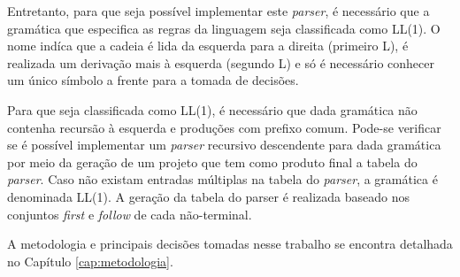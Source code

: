 Entretanto, para que seja possível implementar este \textit{parser}, é necessário que a gramática que especifica as regras da linguagem seja classificada como LL(1). O nome indíca que a cadeia é lida da esquerda para a direita (primeiro L), é realizada um derivação mais à esquerda (segundo L) e só é necessário conhecer um único símbolo a frente para a tomada de decisões.

Para que seja classificada como LL(1), é necessário que dada gramática não contenha recursão à esquerda e produções com prefixo comum. Pode-se verificar se é possível implementar um \textit{parser} recursivo descendente para dada gramática por meio da geração de um projeto que tem como produto final a tabela do \textit{parser}. Caso não existam entradas múltiplas na tabela do \textit{parser}, a gramática é denominada LL(1). A geração da tabela do parser é realizada baseado nos conjuntos \textit{first} e \textit{follow} de cada não-terminal.

A metodologia e principais decisões tomadas nesse trabalho se encontra detalhada no Capítulo \ref{cap:metodologia}.

